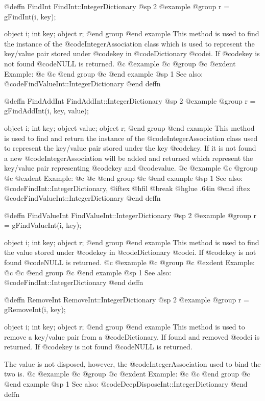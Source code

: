 @deffn {FindInt} FindInt::IntegerDictionary
@sp 2
@example
@group
r = gFindInt(i, key);

object  i;
int     key;
object  r;
@end group
@end example
This method is used to find the instance of the @code{IntegerAssociation}
class which is used to represent the key/value pair stored under
@code{key} in @code{Dictionary} @code{i}.  If @code{key} is not found
@code{NULL} is returned.
@c @example
@c @group
@c @exdent Example:
@c 
@c @end group
@c @end example
@sp 1
See also:  @code{FindValueInt::IntegerDictionary}
@end deffn










@deffn {FindAddInt} FindAddInt::IntegerDictionary
@sp 2
@example
@group
r = gFindAddInt(i, key, value);

object  i;
int     key;
object  value;
object  r;
@end group
@end example
This method is used to find and return the instance of the
@code{IntegerAssociation} class used to represent the key/value pair
stored under the key @code{key}.  If it is not found a new
@code{IntegerAssociation} will be added and returned which represent the
key/value pair representing @code{key} and @code{value}.
@c @example
@c @group
@c @exdent Example:
@c 
@c @end group
@c @end example
@sp 1
See also:  @code{FindInt::IntegerDictionary,}
@iftex
@hfil @break @hglue .64in      
@end iftex
@code{FindValueInt::IntegerDictionary}
@end deffn









@deffn {FindValueInt} FindValueInt::IntegerDictionary
@sp 2
@example
@group
r = gFindValueInt(i, key);

object  i;
int     key;
object  r;
@end group
@end example
This method is used to find the value stored under @code{key} in
@code{Dictionary} @code{i}.  If @code{key} is not found @code{NULL} is
returned.
@c @example
@c @group
@c @exdent Example:
@c 
@c @end group
@c @end example
@sp 1
See also:  @code{FindInt::IntegerDictionary}
@end deffn











@deffn {RemoveInt} RemoveInt::IntegerDictionary
@sp 2
@example
@group
r = gRemoveInt(i, key);

object  i;
int     key;
object  r;
@end group
@end example
This method is used to remove a key/value pair from a @code{Dictionary}.
If found and removed @code{i} is returned.  If @code{key} is not found
@code{NULL} is returned.

The value is not disposed, however, the @code{IntegerAssociation} used to
bind the two is.
@c @example
@c @group
@c @exdent Example:
@c 
@c @end group
@c @end example
@sp 1
See also:  @code{DeepDisposeInt::IntegerDictionary}
@end deffn





